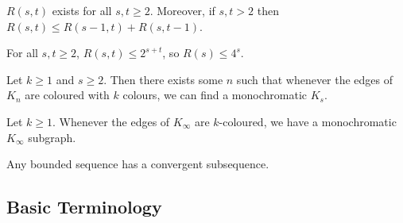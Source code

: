 \documentclass{article}
\begin{document}
\begin{nthm}\label{thm:ramsey}
    $R(s, t)$ exists for all $s, t \geq 2$.
    Moreover, if $s, t > 2$ then $R(s, t) \leq R(s-1, t) + R(s, t-1)$.
\end{nthm}

\begin{ncor}\label{cor:3}
    For all $s, t \geq 2$, $R(s, t) \leq 2^{s+t}$, so $R(s) \leq 4^s$.
\end{ncor}


\begin{nthm}\label{thm:multiRamsey}
    Let $k \geq 1$ and $s \geq 2$.
    Then there exists some $n$ such that whenever the edges of $K_n$ are coloured with $k$ colours, we can find a monochromatic $K_s$.
\end{nthm}


















\begin{nthm}\label{thm:infRamsey}
    Let $k \geq 1$. Whenever the edges of $K_\infty$ are $k$-coloured, we have a monochromatic $K_\infty$ subgraph.
\end{nthm}


\begin{ncor}
    Any bounded sequence has a convergent subsequence.
\end{ncor}

\subsection{Basic Terminology}





























\clearpage
\end{document}
